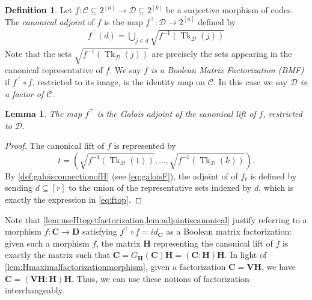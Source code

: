 \documentclass[11pt,letterpaper, reqno]{amsart}
\newtheorem{lem}[thm]{Lemma}         %
\theoremstyle{definition}
\newtheorem{defn}[thm]{Definition}   %
\DeclareMathOperator{\tk}{Tk}
\def\bC{\mathbf{C}}
\def\bD{\mathbf{D}}
\def\bH{\mathbf{H}}
\def\bV{\mathbf{V}}
\def\cC{\mathcal{C}}
\def\cD{\mathcal{D}}
\begin{document}
        
        \begin{defn}\label{def:morphismadjoint}
            Let $f: \cC \subseteq 2^{[n]} \to \cD \subseteq 2^{[k]}$ be a surjective morphism of codes. The \emph{canonical adjoint} of $f$ is the map $f^\top: \cD \to 2^{[n]}$ defined by
            \begin{align}
                f^\top(d) = \bigcup_{j\in d} \sqrt{f^{-1}(\tk_\cD(j))}\label{eq:ftop}
            \end{align}
            Note that the sets $\sqrt{f^{-1}(\tk_\cD(j))}$ are precisely the sets appearing in the canonical representative of $f$.
            We say \emph{$f$ is a Boolean Matrix Factorization (BMF)} if $f^\top \circ f$, restricted to its image, is the identity map on $\cC$. In this case we say \emph{$\cD$ is a factor of $\cC$}.
        \end{defn}

        \begin{lem}\label{lem:adjointiscanonical}
            The map $f^\top$ is the Galois adjoint of the canonical lift of $f$, restricted to $\cD$.
        \end{lem}
        \begin{proof}
            The canonical lift of $f$ is represented by
            \[ t = (\sqrt{f^{-1}(\tk_\cD(1))},\dots,\sqrt{f^{-1}(\tk_\cD(k))}). \]
            By \cref{def:galoisconnectionofH} (see \eqref{eq:galoisF}), the adjoint of of $f_t$ is defined by sending $d \subseteq [r]$ to the union of the representative sets indexed by $d$, which is exactly the expression in \eqref{eq:ftop}.
        \end{proof}
        \noindent Note that \cref{lem:useHtogetfactorization,lem:adjointiscanonical} justify referring to a morphism $f: \bC \to \bD$ satisfying $f^\top \circ f = id_\bC$ as a Boolean matrix factorization: given such a morphism $f$, the matrix $\bH$ representing the canonical lift of $f$ is exactly the matrix such that $\bC = G_\bH(\bC)\bH = (\bC : \bH)\bH$.
        In light of \cref{lem:Hmaximalfactorizationmorphism}, given a factorization $\bC = \bV\bH$, we have $\bC = (\bV\bH: \bH)\bH$.
        Thus, we can use these notions of factorization interchangeably.
\end{document}
